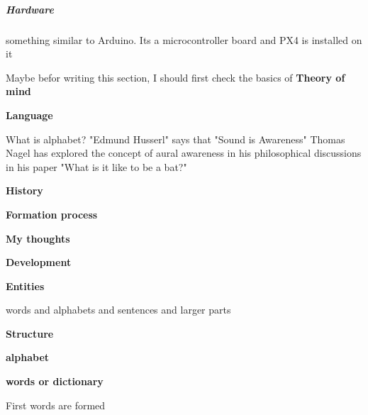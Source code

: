 \documentclass{book}
\providecommand{\ProjectDeepHeading}[2]{%
    \par\medskip\noindent\textbf{#2}\par\smallskip
}
\begin{document}
\subparagraph{Hardware}


something similar to Arduino. Its a microcontroller board and PX4 is installed on it


Maybe befor writing this section, I should first check the basics of \textbf{Theory of mind}


\ProjectDeepHeading{1}{Language}

What is alphabet? "Edmund Husserl" says that "Sound is Awareness" Thomas Nagel has explored the concept of aural awareness in his philosophical discussions in his paper "What is it like to be a bat?"

\ProjectDeepHeading{2}{History}

\ProjectDeepHeading{2}{Formation process}
    \ProjectDeepHeading{3}{My thoughts}
        
        \ProjectDeepHeading{5}{Development}
            
            \begin{figure}[H]
                \raggedright
            \end{figure}
            
        \ProjectDeepHeading{5}{Entities}
            
            words and alphabets and sentences and larger parts
            
        
        
    
\ProjectDeepHeading{2}{Structure}
    \ProjectDeepHeading{3}{alphabet}
    \ProjectDeepHeading{3}{words or dictionary}
        First words are formed
        
\end{document}

